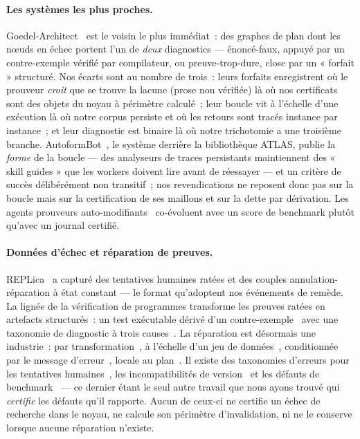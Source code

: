 \documentclass[11pt]{article}
\theoremstyle{remark}\newtheorem{example}{Exemple}
\begin{document}
\paragraph{Les systèmes les plus proches.}
Goedel-Architect~\cite{goedelarchitect2026} est le voisin le plus immédiat~: des
graphes de plan dont les n\oe uds en échec portent l'un de \emph{deux} diagnostics ---
énoncé-faux, appuyé par un contre-exemple vérifié par compilateur, ou
preuve-trop-dure, close par un « forfait » structuré. Nos écarts sont au nombre de
trois~: leurs forfaits enregistrent où le prouveur \emph{croit} que se trouve la
lacune (prose non vérifiée) là où nos certificats sont des objets du noyau à périmètre
calculé~; leur boucle vit à l'échelle d'une exécution là où notre corpus persiste et
où les retours sont tracés instance par instance~; et leur diagnostic est binaire là où
notre trichotomie a une troisième branche. AutoformBot~\cite{atlas2026}, le système
derrière la bibliothèque ATLAS, publie la \emph{forme} de la boucle --- des analyseurs
de traces persistants maintiennent des « skill guides » que les workers doivent lire
avant de réessayer --- et un critère de succès délibérément non transitif~; nos
revendications ne reposent donc pas sur la boucle mais sur la certification de ses
maillons et sur la dette par dérivation. Les agents prouveurs
auto-modifiants~\cite{selfmodifying2026} co-évoluent avec un score de benchmark plutôt
qu'avec un journal certifié.

\paragraph{Données d'échec et réparation de preuves.}
REPLica~\cite{ringer2020replica} a capturé des tentatives humaines ratées et des
couples annulation-réparation à état constant --- le format qu'adoptent nos événements
de remède. La lignée de la vérification de programmes transforme les preuves ratées en
artefacts structurés~: un test exécutable dérivé d'un
contre-exemple~\cite{huang2023proof2test} avec une taxonomie de diagnostic à trois
causes~\cite{petiot2016fails}. La réparation est désormais une industrie~: par
transformation~\cite{ringer2018pumpkin}, à l'échelle d'un
jeu de données~\cite{reichel2023proofrepair},
conditionnée par le message d'erreur~\cite{first2023baldur,april2026},
locale au plan~\cite{blueprintrepair2026}.
Il existe des taxonomies d'erreurs pour les tentatives humaines~\cite{aitken2000errors},
les incompatibilités de version~\cite{hou2025versions} et les défauts de
benchmark~\cite{faults2026} --- ce dernier étant le seul autre travail que nous ayons
trouvé qui \emph{certifie} les défauts qu'il rapporte. Aucun de ceux-ci ne certifie un
échec de recherche dans le noyau, ne calcule son périmètre d'invalidation, ni ne le
conserve lorsque aucune réparation n'existe.
\end{document}

